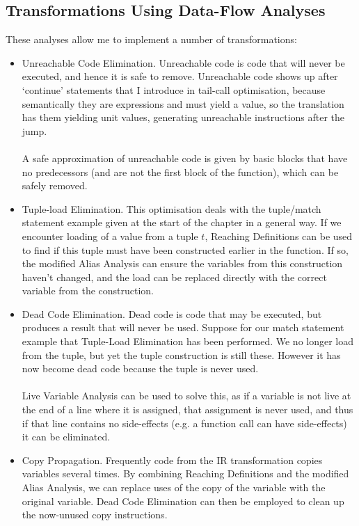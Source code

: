 \subsection{Transformations Using Data-Flow Analyses}
These analyses allow me to implement a number of transformations:
\begin{itemize}
\item Unreachable Code Elimination. Unreachable code is code that will never be executed, and hence it is safe to remove. Unreachable code shows up after `continue' statements that I introduce in tail-call optimisation, because semantically they are expressions and must yield a value, so the translation has them yielding unit values, generating unreachable instructions after the jump.
\\\\
A safe approximation of unreachable code is given by basic blocks that have no predecessors (and are not the first block of the function), which can be safely removed.

\item Tuple-load Elimination. This optimisation deals with the tuple/match statement example given at the start of the chapter in a general way. If we encounter loading of a value from a tuple $t$, Reaching Definitions can be used to find if this tuple must have been constructed earlier in the function. If so, the modified Alias Analysis can ensure the variables from this construction haven't changed, and the load can be replaced directly with the correct variable from the construction.

\item Dead Code Elimination. Dead code is code that may be executed, but produces a result that will never be used. Suppose for our match statement example that Tuple-Load Elimination has been performed. We no longer load from the tuple, but yet the tuple construction is still these. However it has now become dead code because the tuple is never used.
\\\\
Live Variable Analysis can be used to solve this, as if a variable is not live at the end of a line where it is assigned, that assignment is never used, and thus if that line contains no side-effects (e.g. a function call can have side-effects) it can be eliminated.

\item Copy Propagation. Frequently code from the IR transformation copies variables several times. By combining Reaching Definitions and the modified Alias Analysis, we can replace uses of the copy of the variable with the original variable. Dead Code Elimination can then be employed to clean up the now-unused copy instructions.

\end{itemize}

